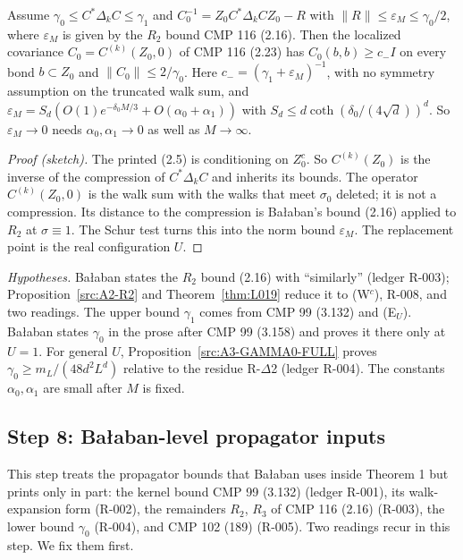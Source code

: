 \begin{proposition}\label{src:LOC}
Assume $\gamma_0\le C^*\Delta_kC\le\gamma_1$ and $C_0^{-1}=Z_0C^*\Delta_kCZ_0-R$ with $\|R\|\le\varepsilon_M\le\gamma_0/2$, where $\varepsilon_M$ is given by the $R_2$ bound CMP 116 (2.16). Then the localized covariance $C_0=C^{(k)}(Z_0,0)$ of CMP 116 (2.23) has $C_0(b,b)\ge c_-I$ on every bond $b\subset Z_0$ and $\|C_0\|\le2/\gamma_0$. Here $c_-=(\gamma_1+\varepsilon_M)^{-1}$, with no symmetry assumption on the truncated walk sum, and $\varepsilon_M=S_d(O(1)e^{-\delta_0M/3}+O(\alpha_0+\alpha_1))$ with $S_d\le d\coth(\delta_0/(4\sqrt d))^d$. So $\varepsilon_M\to0$ needs $\alpha_0,\alpha_1\to0$ as well as $M\to\infty$.
\end{proposition}
\begin{proof}[Proof (sketch)]
The printed (2.5) is conditioning on $Z_0^c$. So $C^{(k)}(Z_0)$ is the inverse of the compression of $C^*\Delta_kC$ and inherits its bounds. The operator $C^{(k)}(Z_0,0)$ is the walk sum with the walks that meet $\sigma_0$ deleted; it is not a compression. Its distance to the compression is Ba{\l}aban's bound (2.16) applied to $R_2$ at $\sigma\equiv1$. The Schur test turns this into the norm bound $\varepsilon_M$. The replacement point is the real configuration $U$.
\end{proof}
\emph{Hypotheses.} Ba{\l}aban states the $R_2$ bound (2.16) with ``similarly'' (ledger R-003); Proposition~\ref{src:A2-R2} and Theorem~\ref{thm:L019} reduce it to (W$^c$), R-008, and two readings. The upper bound $\gamma_1$ comes from CMP 99 (3.132) and (E$_U$). Ba{\l}aban states $\gamma_0$ in the prose after CMP 99 (3.158) and proves it there only at $U=1$. For general $U$, Proposition~\ref{src:A3-GAMMA0-FULL} proves $\gamma_0\ge m_L/(48d^2L^d)$ relative to the residue R-$\Delta$2 (ledger R-004). The constants $\alpha_0,\alpha_1$ are small after $M$ is fixed.

\subsection{Step 8: Ba{\l}aban-level propagator inputs}\label{sec:src-A}

This step treats the propagator bounds that Ba{\l}aban uses inside Theorem 1 but prints only in part: the kernel bound CMP 99 (3.132) (ledger R-001), its walk-expansion form (R-002), the remainders $R_2$, $R_3$ of CMP 116 (2.16) (R-003), the lower bound $\gamma_0$ (R-004), and CMP 102 (189) (R-005). Two readings recur in this step. We fix them first.

